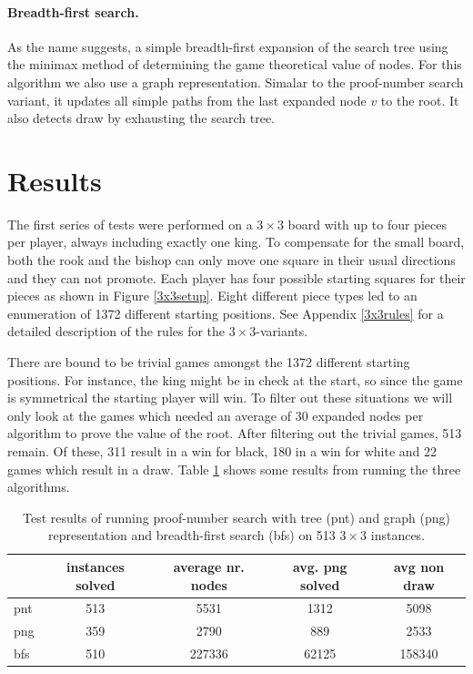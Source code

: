 \documentclass{article}
\begin{document}
\paragraph{Breadth-first search.} As the name suggests, a simple breadth-first expansion of the search tree using the minimax method of determining
the game theoretical value of nodes. For this algorithm we also use a graph representation. Simalar to the proof-number search variant, it
updates all simple paths from the last expanded node $v$ to the root. It also detects draw by exhausting the search tree.

\section{Results}
\label{sec:results}
The first series of tests were performed on a $3 \times 3$ board with up to four pieces per player, always including exactly one king. To compensate
for the small board, both the rook and the bishop can only move one square in their usual directions and they can not promote. Each player
has four possible starting squares for their pieces as shown in Figure \ref{3x3setup}.
Eight different piece types led to an enumeration of 1372 different starting positions.
See Appendix \ref{3x3rules} for a detailed description of the rules for the $3 \times 3$-variants.

There are bound to be trivial games amongst the 1372 different starting positions. For instance, the king might be in check at the start, so since
the game is symmetrical the starting player will win. To filter out these situations we will only look at the games which needed an
average of 30 expanded nodes per algorithm to prove the value of the root. After filtering out the trivial games, 513 remain. Of these, 311 result
in a win for black, 180 in a win for white and 22 games which result in a draw. Table \ref{table:3x3result} shows some results from running the three
algorithms.

\begin{table}[h]
\begin{tabular}{l | c | c | c | c}
 & instances solved & average nr. nodes & avg. png solved & avg non draw \\ \hline
pnt & 513 & 5531 & 1312 & 5098\\
png & 359 & 2790 & 889 & 2533\\
bfs & 510 & 227336 & 62125 & 158340\\
\end{tabular}
\label{table:3x3result}
\caption{Test results of running proof-number search with tree (pnt) and graph (png) representation and breadth-first search (bfs) on 513 $3 \times 3$
instances.}
\end{table}
\end{document}
